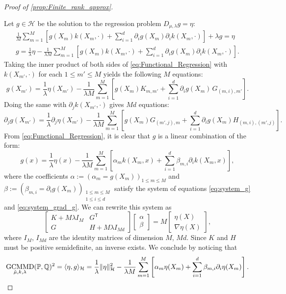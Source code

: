 \documentclass{article}
\newcommand{\h}{\mathcal H}
\newcommand{\PP}{\mathbb P}
\newcommand{\QQ}{\mathbb Q}
\newcommand{\tp}{^\mathsf{T}}
\DeclareMathOperator{\GCMMD}{GCMMD}
\begin{document}
\begin{proof}[Proof of \cref{prop:Finite_rank_approx}]
\label{proof:Finite_rank_approx}

Let $g \in \h$ be the solution to the regression problem $D_{\mu,\lambda} g = \eta$:
\begin{gather}
  \frac1M \sum_{m=1}^M\left[
    g(X_m) k(X_m, \cdot)
    + \sum_{i=1}^d \partial_i g(X_m) \partial_i k(X_m, \cdot)
  \right]
  + \lambda g
  = \eta
  \nonumber
  \\
  g =
  \frac1\lambda \eta
  - \frac{1}{\lambda M} \sum_{m=1}^M\left[
    g(X_m) k(X_m, \cdot)
    + \sum_{i=1}^d \partial_i g(X_m) \partial_i k(X_m, \cdot)
  \right]
  \label{eq:Functional_Regression}
.\end{gather}
Taking the inner product of both sides of \eqref{eq:Functional_Regression}
with $k(X_{m'}, \cdot)$ for each $1 \le m' \le M$
yields the following $M$ equations:
\begin{equation}
  g(X_{m'})
  = \frac{1}{\lambda}\eta(X_{m'})
  - \frac{1}{\lambda M} \sum_{m=1}^{M} \left[
      g(X_{m}) K_{m,m'} + \sum_{i=1}^{d} \partial_{i} g(X_{m}) \, G_{(m, i), m'} \right]
  \label{eq:system_g}
.\end{equation}
Doing the same with $\partial_j k(X_{m'}, \cdot)$ gives $M d$ equations:
\begin{equation}
  \partial_{j}g(X_{m'})
  = \frac{1}{\lambda} \partial_{j} \eta(X_{m'})
  - \frac{1}{\lambda M} \sum_{m=1}^{M} \left[
      g(X_{m}) G_{(m', j), m}  + \sum_{i=1}^{d} \partial_{i} g(X_{m}) H_{(m,i), (m', j)} \right]
  \label{eq:system_grad_g}
.\end{equation}
From \eqref{eq:Functional_Regression}, it is clear that $g$ is a linear
combination of the form:
\[
  g(x)
  = \frac{1}{\lambda} \eta(x)
  - \frac{1}{\lambda M} \sum_{m=1}^{M}\left[
      \alpha_{m} k(X_{m}, x)
      + \sum_{i=1}^{d} \beta_{m,i} \partial_{i} k(X_{m}, x)
  \right]
,\]
where the coefficients $\alpha:=\left(\alpha_{m}=g(X_{m})\right)_{1\leq m\leq M}$
and $\beta:=\left(\beta_{m,i}=\partial_{i}g(X_{m})\right)_{\substack{1\leq m\leq M\\
1\leq i\leq d
}
}$ satisfy the system of equations \eqref{eq:system_g} and \eqref{eq:system_grad_g}.
We can rewrite this system as
\[
  \begin{bmatrix}
    K+M\lambda I_{M} & G\tp \\
    G & H+M\lambda I_{Md}
  \end{bmatrix}
  \begin{bmatrix}\alpha\\\beta\end{bmatrix}
  = M \begin{bmatrix} \eta(X) \\ \nabla\eta(X) \end{bmatrix}
,\]
where $I_{M}$, $I_{Md}$ are the identity matrices of dimension $M$, $Md$.
Since $K$ and $H$ must be positive semidefinite, an inverse exists.
We conclude by noticing that
\[
  \GCMMD_{\hat\mu,k,\lambda}(\PP, \QQ)^2
  = \langle \eta, g \rangle_{\h}
  = \frac{1}{\lambda} \lVert\eta\rVert_{\h}^{2}
  - \frac{1}{\lambda M} \sum_{m=1}^{M}\left[
    \alpha_{m} \eta(X_{m}) + \sum_{i=1}^{d} \beta_{m,i} \partial_{i}\eta(X_{m})
  \right]
.\qedhere \]
\end{proof}
\end{document}
